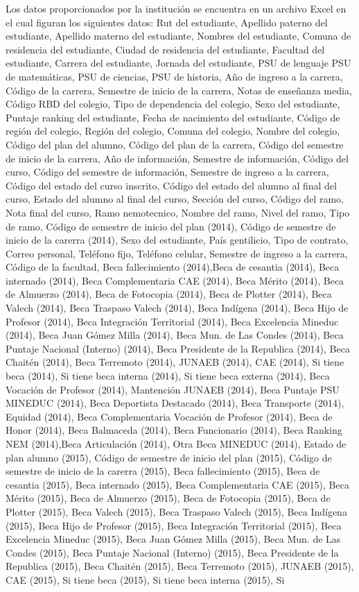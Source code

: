 Los datos proporcionados por la institución se encuentra en un archivo Excel en el cual figuran los siguientes datos: Rut del estudiante, Apellido paterno del estudiante, Apellido materno del estudiante, Nombres del estudiante, Comuna de residencia del estudiante, Ciudad de residencia del estudiante, Facultad del estudiante, Carrera del estudiante, Jornada del estudiante, PSU de lenguaje
PSU de matemáticas, PSU de ciencias, PSU de historia, Año de ingreso a la carrera, Código de la carrera, Semestre de inicio de la carrera, Notas de enseñanza media, Código RBD del colegio, Tipo de dependencia del colegio, Sexo del estudiante, Puntaje ranking del estudiante, Fecha de nacimiento del estudiante, Código de región del colegio, Región del colegio, Comuna del colegio, Nombre del colegio, Código del plan del alumno, Código del  plan de la carrera, Código del semestre de inicio de la carrera, Año de información, Semestre de información, Código del curso, Código del semestre de información, Semestre de ingreso a la carrera, Código del estado del curso inscrito, Código del estado del alumno al final del curso, Estado del alumno al final del curso, Sección del curso, Código del ramo, Nota final del curso, Ramo nemotecnico, Nombre del ramo, Nivel del ramo, Tipo de ramo, Código de semestre de inicio del plan (2014), Código de semestre de inicio de la carerra (2014), Sexo del estudiante, País gentilicio, Tipo de contrato, Correo personal, Teléfono fijo, Teléfono celular, Semestre de ingreso a la carrera, Código de la facultad, Beca fallecimiento (2014),Beca de cesantia (2014), Beca internado (2014), Beca Complementaria CAE (2014), Beca Mérito (2014), Beca de Almuerzo (2014), Beca de Fotocopia (2014), Beca de Plotter (2014), Beca Valech (2014), Beca Traspaso Valech (2014), Beca Indígena (2014), Beca Hijo de Profesor (2014), Beca Integración Territorial (2014), Beca Excelencia Mineduc (2014), Beca Juan Gómez Milla (2014), Beca Mun. de Las Condes (2014), Beca Puntaje Nacional (Interno) (2014), Beca Presidente de la Republica (2014), Beca Chaitén (2014), Beca Terremoto (2014), JUNAEB (2014), CAE (2014), Si tiene beca (2014), Si tiene beca interna (2014), Si tiene beca externa (2014), Beca Vocación de Profesor (2014), Mantención JUNAEB (2014), Beca Puntaje PSU MINEDUC (2014), Beca Deportista Destacado (2014), Beca Transporte (2014), Equidad (2014), Beca Complementaria Vocación de Profesor (2014), Beca de Honor (2014), Beca Balmaceda (2014), Beca Funcionario (2014), Beca Ranking NEM (2014),Beca Articulación (2014), Otra Beca MINEDUC (2014), Estado de plan alumno (2015), Código de semestre de inicio del plan (2015), Código de semestre de inicio de la carerra (2015), Beca fallecimiento (2015), Beca de cesantia (2015), Beca internado (2015), Beca Complementaria CAE (2015), Beca Mérito (2015), Beca de Almuerzo (2015), Beca de Fotocopia (2015), Beca de Plotter (2015), Beca Valech (2015), Beca Traspaso Valech (2015), Beca Indígena (2015), Beca Hijo de Profesor (2015), Beca Integración Territorial (2015), Beca Excelencia Mineduc (2015), Beca Juan Gómez Milla (2015), Beca Mun. de Las Condes (2015), Beca Puntaje Nacional (Interno) (2015), Beca Presidente de la Republica (2015), Beca Chaitén (2015), Beca Terremoto (2015), JUNAEB (2015), CAE (2015), Si tiene beca (2015), Si tiene beca interna (2015), Si 